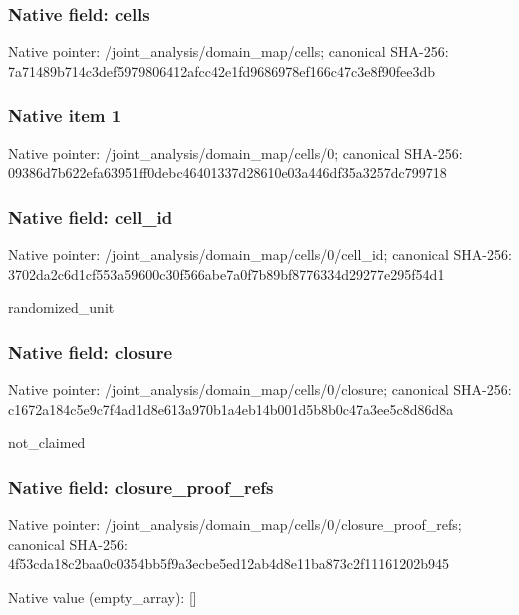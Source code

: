 \documentclass[10pt,a4paper]{article}
\begin{document}
\subsubsection{Native field: cells}
Native pointer: /joint\_\allowbreak{}analysis/domain\_\allowbreak{}map/cells; canonical SHA-256: 7a71489b714c3def5979806412afcc42e1fd9686978ef166c47c3e8f90fee3db

\subsubsection{Native item 1}
Native pointer: /joint\_\allowbreak{}analysis/domain\_\allowbreak{}map/cells/0; canonical SHA-256: 09386d7b622efa63951ff0debc46401337d28610e03a446df35a3257dc799718

\subsubsection{Native field: cell\_\allowbreak{}id}
Native pointer: /joint\_\allowbreak{}analysis/domain\_\allowbreak{}map/cells/0/cell\_\allowbreak{}id; canonical SHA-256: 3702da2c6d1cf553a59600c30f566abe7a0f7b89bf8776334d29277e295f54d1

\begingroup\raggedright\sloppy randomized\_\allowbreak{}unit\par\endgroup

\subsubsection{Native field: closure}
Native pointer: /joint\_\allowbreak{}analysis/domain\_\allowbreak{}map/cells/0/closure; canonical SHA-256: c1672a184c5e9c7f4ad1d8e613a970b1a4eb14b001d5b8b0c47a3ee5c8d86d8a

\begingroup\raggedright\sloppy not\_\allowbreak{}claimed\par\endgroup

\subsubsection{Native field: closure\_\allowbreak{}proof\_\allowbreak{}refs}
Native pointer: /joint\_\allowbreak{}analysis/domain\_\allowbreak{}map/cells/0/closure\_\allowbreak{}proof\_\allowbreak{}refs; canonical SHA-256: 4f53cda18c2baa0c0354bb5f9a3ecbe5ed12ab4d8e11ba873c2f11161202b945

Native value (empty\_\allowbreak{}array): []
\end{document}
